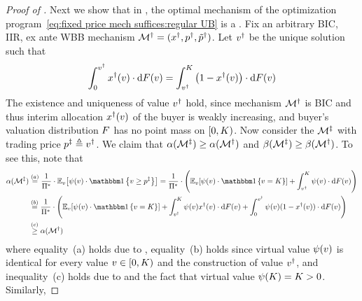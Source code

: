 \begin{proof}[Proof of ]
Next we show that in , the optimal mechanism of the optimization program~\eqref{eq:fixed price mech suffices:regular UB} is a {\FixPrice}. Fix an arbitrary BIC, IIR, ex ante WBB mechanism $\mathcal{M}^\dagger = (x^\dagger,p^\dagger,\tilde{p}^\dagger)$. Let $v^\dagger$ be the unique solution such that
\begin{align*}
    \displaystyle\int_0^{v^\dagger} x^\dagger(v) \cdot \mathrm{d}F(v) 
    =
    \displaystyle\int_{v^\dagger}^{K} \left(1 - x^\dagger(v)\right)\cdot \mathrm{d}F(v)
\end{align*}
The existence and uniqueness of value $v^\dagger$ hold, since mechanism $\mathcal{M}^\dagger$ is BIC and thus interim allocation $x^\dagger(v)$ of the buyer is weakly increasing, and buyer's valuation distribution $F$ has no point mass on $[0, K)$. Now consider the {\FixPrice} $\mathcal{M}^\ddagger$ with trading price $p^\ddagger \triangleq v^\dagger$. We claim that $\alpha(\mathcal{M}^\ddagger) \geq \alpha(\mathcal{M}^\dagger)$ and $\beta(\mathcal{M}^\ddagger) \geq \beta(\mathcal{M}^\dagger)$.
To see this, note that 
\begin{align*}
    \revratio(\mech\doubleprimed) &\overset{(a)}{=} \frac{1}{\sellerbenchmark}\cdot \expect[\val]{\virtualval(\val)\cdot \indicator{\val\geq \price\doubleprimed}}
    =
    \frac{1}{\sellerbenchmark}\cdot 
    \left(\expect[\val]{\virtualval(\val)\cdot \indicator{\val= \constantH}}
    +
    \displaystyle\int_{\val\primed}^{\constantH} \virtualval(\val)\cdot \d\buyercdf(\val)
    \right)
    \\
    &\overset{(b)}{=}
    \frac{1}{\sellerbenchmark}\cdot 
    \left(\expect[\val]{\virtualval(\val)\cdot \indicator{\val= \constantH}}
    +
    \displaystyle\int_{\val\primed}^{\constantH} \virtualval(\val)\alloc\primed(\val)\cdot \d\buyercdf(\val)
    +
    \displaystyle\int_0^{\val\primed} \virtualval(\val)(1-\alloc\primed(\val))\cdot \d\buyercdf(\val)
    \right)
    \\
    &\overset{(c)}{\geq}
    \revratio(\mech\primed)
\end{align*}
where equality~(a) holds due to ,
equality~(b) holds since virtual value $\psi(v)$ is identical for every value $v\in[0, K)$ and the construction of value $v^\dagger$,
and inequality~(c) holds due to  and the fact that virtual value $\psi(K) = K > 0$. Similarly,

\end{proof}
